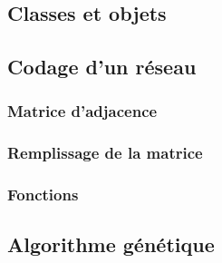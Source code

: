 \subsection{Classes et objets}

\subsection{Codage d'un réseau}
\subsubsection{Matrice d'adjacence}
\subsubsection{Remplissage de la matrice}
\subsubsection{Fonctions}

\subsection{Algorithme génétique}
%
%
%
%

